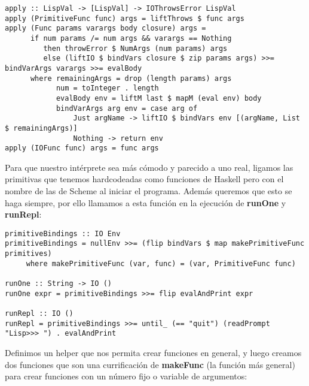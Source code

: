 \begin{minipage}{\linewidth}
\begin{tiny}
\begin{lstlisting}[frame=single]
apply :: LispVal -> [LispVal] -> IOThrowsError LispVal
apply (PrimitiveFunc func) args = liftThrows $ func args
apply (Func params varargs body closure) args =
      if num params /= num args && varargs == Nothing
         then throwError $ NumArgs (num params) args
         else (liftIO $ bindVars closure $ zip params args) >>= bindVarArgs varargs >>= evalBody
      where remainingArgs = drop (length params) args
            num = toInteger . length
            evalBody env = liftM last $ mapM (eval env) body
            bindVarArgs arg env = case arg of
                Just argName -> liftIO $ bindVars env [(argName, List $ remainingArgs)]
                Nothing -> return env
apply (IOFunc func) args = func args
\end{lstlisting}
\end{tiny}
\end{minipage}

Para que nuestro int\'erprete sea m\'as c\'omodo y parecido a uno real, ligamos las primitivas que tenemos hardcodeadas como funciones de Haskell pero con el nombre de las de Scheme al iniciar el programa. Adem\'as queremos que esto se haga siempre, por ello llamamos a esta funci\'on en la ejecuci\'on de \textbf{runOne} y \textbf{runRepl}:\\

\begin{minipage}{\linewidth}
\begin{tiny}
\begin{lstlisting}[frame=single]
primitiveBindings :: IO Env
primitiveBindings = nullEnv >>= (flip bindVars $ map makePrimitiveFunc primitives)
     where makePrimitiveFunc (var, func) = (var, PrimitiveFunc func)

runOne :: String -> IO ()
runOne expr = primitiveBindings >>= flip evalAndPrint expr

runRepl :: IO ()
runRepl = primitiveBindings >>= until_ (== "quit") (readPrompt "Lisp>>> ") . evalAndPrint
\end{lstlisting}
\end{tiny}
\end{minipage}

Definimos un helper que nos permita crear funciones en general, y luego creamos dos funciones que son una currificaci\'on de \textbf{makeFunc} (la funci\'on m\'as general) para crear funciones con un n\'umero fijo o variable de argumentos:\\

